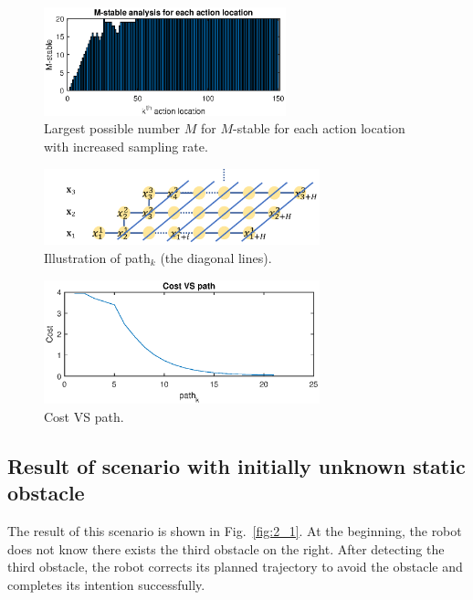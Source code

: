 \documentclass{ifacconf}
\begin{document}
\begin{figure}[t]
\begin{center}
\includegraphics[width=7cm]{plot/1_4.eps}
\caption{Largest possible number $M$ for $M$-stable for each action location with increased sampling rate.}
\label{fig:1_4}
\end{center}
\end{figure}



\begin{figure}[t]
\begin{center}
\includegraphics[width=8cm]{src/1_3_path.png}
\caption{Illustration of path$_k$ (the diagonal lines).}
\label{fig:cost1}
\end{center}
\end{figure}

\begin{figure}[t]
\begin{center}
\includegraphics[width=8cm]{plot/1_3.eps}
\caption{Cost VS path.}
\label{fig:costplot}
\end{center}
\end{figure}

\subsection{Result of scenario with initially unknown static obstacle}

The result of this scenario is shown in Fig.~\ref{fig:2_1}. At the beginning, the robot does not know there exists the third obstacle on the right. After detecting the third obstacle, the robot corrects its planned trajectory to avoid the obstacle and completes its intention successfully.
\end{document}

